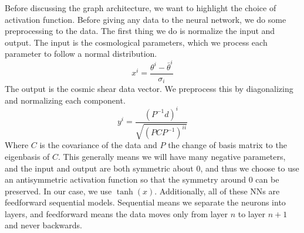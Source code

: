 Before discussing the graph architecture, we want to highlight the choice of activation function. Before giving any data to the neural network, we do some preprocessing to the data. The first thing we do is normalize the input and output. The input is the cosmological parameters, which we process each parameter to follow a normal distribution.
\begin{equation}
	x^i = \frac{\theta^i - \bar\theta^i}{\sigma_i}
\end{equation}
The output is the cosmic shear data vector. We preprocess this by diagonalizing and normalizing each component.
\begin{equation}
	y^i = \frac{ (P^{-1}d)^i }{\sqrt{(PCP^{-1})^{ii}}}
\end{equation}
Where $C$ is the covariance of the data and $P$ the change of basis matrix to the eigenbasis of $C$. This generally means we will have many negative parameters, and the input and output are both symmetric about 0, and thus we choose to use an antisymmetric activation function so that the symmetry around 0 can be preserved. In our case, we use $\tanh(x)$. Additionally, all of these NNs are feedforward sequential models. Sequential means we separate the neurons into layers, and feedforward means the data moves only from layer $n$ to layer $n+1$ and never backwards.

